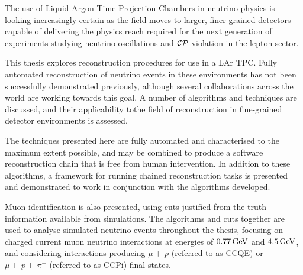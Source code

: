 The use of Liquid Argon Time-Projection Chambers in neutrino physics is looking increasingly certain as the field moves to larger, finer-grained detectors capable of delivering the physics reach required for the next generation of experiments studying neutrino oscillations and $\mathcal{C}\mathcal{P}$ violation in the lepton sector. 

This thesis explores reconstruction procedures for use in a \ac{LAr TPC}. Fully automated reconstruction of neutrino events in these environments has not been successfully demonstrated previously, although several collaborations across the world are working towards this goal. A number of algorithms and techniques are discussed, and their applicability tothe field of reconstruction in fine-grained detector environments is assessed.

The techniques presented here are fully automated and characterised to the maximum extent possible, and may be combined to produce a software reconstruction chain that is free from human intervention. In addition to these algorithms, a framework for running chained reconstruction tasks is presented and demonstrated to work in conjunction with the algorithms developed.

Muon identification is also presented, using cuts justified from the truth information available from simulations. The algorithms and cuts together are used to analyse simulated neutrino events throughout the thesis, focusing on charged current muon neutrino interactions at energies of $0.77\,\mathrm{GeV}$ and $4.5\,\mathrm{GeV}$, and considering interactions producing $\mu+\,p$ (referred to as CCQE) or $\mu+\,p+\,\pi^+$ (referred to as CCPi) final states.


